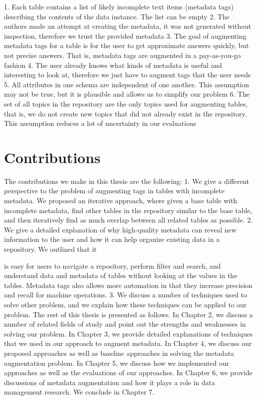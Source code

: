 1. Each table contains a list of likely incomplete text items (metadata tags) describing the contents of the data instance. The list can be empty
2. The authors made an attempt at creating the metadata, it was not generated without inspection, therefore we trust the provided metadata
3. The goal of augmenting metadata tags for a table is for the user to get approximate answers quickly, but not precise answers. That is, metadata tags are augmented in a pay-as-you-go fashion
4. The user already knows what kinds of metadata is useful and interesting to look at, therefore we just have to augment tags that the user needs
5. All attributes in one schema are independent of one another. This assumption may not be true, but it is plausible and allows us to simplify our problem
6. The set of all topics in the repository are the only topics used for augmenting tables, that is, we do not create new topics that did not already exist in the repository. This assumption reduces a lot of uncertainty in our evaluations

\section{Contributions}
\label{sec:Contributions}
The contributions we make in this thesis are the following:
1. We give a different perspective to the problem of augmenting tags in tables with incomplete metadata. We proposed an iterative approach, where given a base table with incomplete metadata, find other tables in the repository similar to the base table, and then iteratively find as much overlap between all related tables as possible.
2. We give a detailed explanation of why high-quality metadata can reveal new information to the user and how it can help organize existing data in a repository. We outlined that it

is easy for users to navigate a repository, perform filter and search, and understand data and metadata of tables without looking at the values in the tables. Metadata tags also allows more automation in that they increase precision and recall for machine operations.
3. We discuss a number of techniques used to solve other problem, and we explain how these techniques can be applied to our problem.
The rest of this thesis is presented as follows. In Chapter 2, we discuss a number of related fields of study and point out the strengths and weaknesses in solving our problem. In Chapter 3, we provide detailed explanations of techniques that we used in our approach to augment metadata. In Chapter 4, we discuss our proposed approaches as well as baseline approaches in solving the metadata augmentation problem. In Chapter 5, we discuss how we implemented our approaches as well as the evaluations of our approaches. In Chapter 6, we provide discussions of metadata augmentation and how it plays a role in data management research. We conclude in Chapter 7.
